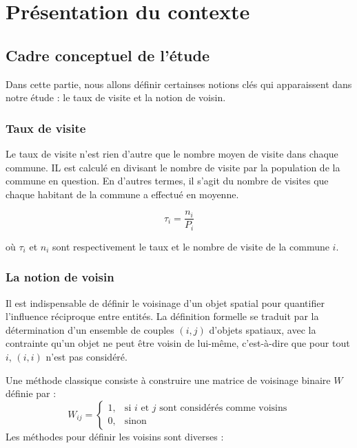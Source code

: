 \documentclass[
]{article}
\author{}
\date{\vspace{-2.5em}}
\begin{document}
\section{Présentation du contexte}\label{pruxe9sentation-du-contexte}

\subsection{Cadre conceptuel de
l'étude}\label{cadre-conceptuel-de-luxe9tude}

Dans cette partie, nous allons définir certainses notions clés qui
apparaissent dans notre étude : le taux de visite et la notion de
voisin.

\subsubsection{Taux de visite}\label{taux-de-visite}

Le taux de visite n'est rien d'autre que le nombre moyen de visite dans
chaque commune. IL est calculé en divisant le nombre de visite par la
population de la commune en question. En d'autres termes, il s'agit du
nombre de visites que chaque habitant de la commune a effectué en
moyenne.

\[\tau_i = \frac{n_i}{P_i}\]

où \(\tau_i\) et \(n_i\) sont respectivement le taux et le nombre de
visite de la commune \(i\).

\subsubsection{La notion de voisin}\label{la-notion-de-voisin}

Il est indispensable de définir le voisinage d'un objet spatial pour
quantifier l'influence réciproque entre entités. La définition formelle
se traduit par la détermination d'un ensemble de couples \((i,j)\)
d'objets spatiaux, avec la contrainte qu'un objet ne peut être voisin de
lui-même, c'est-à-dire que pour tout \(i\), \((i,i)\) n'est pas
considéré.

Une méthode classique consiste à construire une matrice de voisinage
binaire \(W\) définie par : \[
W_{ij} = \begin{cases} 
1, & \text{si } i \text{ et } j \text{ sont considérés comme voisins} \\
0, & \text{sinon}
\end{cases}
\] Les méthodes pour définir les voisins sont diverses :
\end{document}
